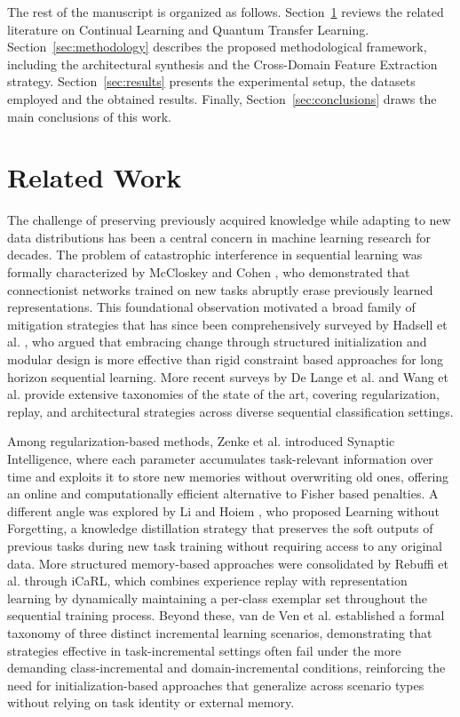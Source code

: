 \documentclass[runningheads]{llncs}
\begin{document}
The rest of the manuscript is organized as follows. Section~\ref{sec:relatedwork} reviews the related literature on Continual Learning and Quantum Transfer Learning. Section~\ref{sec:methodology} describes the proposed methodological framework, including the architectural synthesis and the Cross-Domain Feature Extraction strategy. Section~\ref{sec:results} presents the experimental setup, the datasets employed and the obtained results. Finally, Section~\ref{sec:conclusions} draws the main conclusions of this work.

\section{Related Work}\label{sec:relatedwork}

The challenge of preserving previously acquired knowledge while adapting to new data distributions has been a central concern in machine learning research for decades. The problem of catastrophic interference in sequential learning was formally characterized by McCloskey and Cohen \cite{McCloskey89}, who demonstrated that connectionist networks trained on new tasks abruptly erase previously learned representations. This foundational observation motivated a broad family of mitigation strategies that has since been comprehensively surveyed by Hadsell et al. \cite{Hadsell20}, who argued that embracing change through structured initialization and modular design is more effective than rigid constraint based approaches for long horizon sequential learning. More recent surveys by De Lange et al. \cite{Lange22} and Wang et al. \cite{Wang24} provide extensive taxonomies of the state of the art, covering regularization, replay, and architectural strategies across diverse sequential classification settings.

Among regularization-based methods, Zenke et al. \cite{Zenke17} introduced Synaptic Intelligence, where each parameter accumulates task-relevant information over time and exploits it to store new memories without overwriting old ones, offering an online and computationally efficient alternative to Fisher based penalties. A different angle was explored by Li and Hoiem \cite{Li18}, who proposed Learning without Forgetting, a knowledge distillation strategy that preserves the soft outputs of previous tasks during new task training without requiring access to any original data. More structured memory-based approaches were consolidated by Rebuffi et al. \cite{Rebuffi17} through iCaRL, which combines experience replay with representation learning by dynamically maintaining a per-class exemplar set throughout the sequential training process. Beyond these, van de Ven et al. \cite{Ven22} established a formal taxonomy of three distinct incremental learning scenarios, demonstrating that strategies effective in task-incremental settings often fail under the more demanding class-incremental and domain-incremental conditions, reinforcing the need for initialization-based approaches that generalize across scenario types without relying on task identity or external memory.
\end{document}

